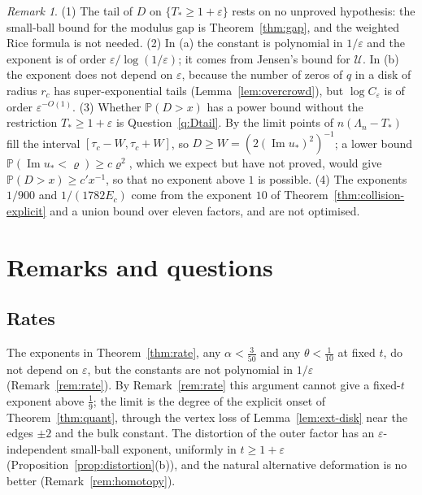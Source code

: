 \documentclass[11pt]{amsart}
\theoremstyle{definition}
\theoremstyle{remark}
\newtheorem{remark}[theorem]{Remark}
\numberwithin{equation}{section}
\newcommand{\PP}{\mathbb{P}}
\newcommand{\eps}{\varepsilon}
\DeclareMathOperator{\im}{Im}
\begin{document}
\begin{remark}\label{rem:Dtail}
(1) The tail of $D$ on $\{T_*\ge1+\eps\}$ rests on no unproved hypothesis: the small-ball bound for the modulus gap is Theorem~\ref{thm:gap}, and the weighted Rice formula is not needed. (2) In (a) the constant is polynomial in $1/\eps$ and the exponent is of order $\eps/\log(1/\eps)$; it comes from Jensen's bound for $\mathcal U$. In (b) the exponent does not depend on $\eps$, because the number of zeros of $q$ in a disk of radius $r_c$ has super-exponential tails (Lemma~\ref{lem:overcrowd}), but $\log C_\eps$ is of order $\eps^{-O(1)}$. (3) Whether $\PP(D>x)$ has a power bound without the restriction $T_*\ge1+\eps$ is Question~\ref{q:Dtail}. By \cite[Theorem~\ref{M-thm:firstorder-intro}]{Main} the limit points of $n(\Lambda_n-T_*)$ fill the interval $[\tau_c-W,\tau_c+W]$, so $D\ge W=(2(\im u_*)^2)^{-1}$; a lower bound $\PP(\im u_*<\varrho)\ge c\varrho^2$, which we expect but have not proved, would give $\PP(D>x)\ge c'x^{-1}$, so that no exponent above $1$ is possible. (4) The exponents $1/900$ and $1/(1782E_c)$ come from the exponent $10$ of Theorem~\ref{thm:collision-explicit} and a union bound over eleven factors, and are not optimised.
\end{remark}

\section{Remarks and questions}\label{sec:remarks}

\subsection{Rates}\label{subsec:rates-questions}
The exponents in Theorem~\ref{thm:rate}, any $\alpha<\frac3{50}$ and any $\theta<\frac1{10}$ at fixed $t$, do not depend on $\eps$, but the constants are not polynomial in $1/\eps$ (Remark~\ref{rem:rate}). By Remark~\ref{rem:rate} this argument cannot give a fixed-$t$ exponent above $\frac19$; the limit is the degree of the explicit onset of Theorem~\ref{thm:quant}, through the vertex loss of Lemma~\ref{lem:ext-disk} near the edges $\pm2$ and the bulk constant. The distortion of the outer factor has an $\eps$-independent small-ball exponent, uniformly in $t\ge1+\eps$ (Proposition~\ref{prop:distortion}(b)), and the natural alternative deformation is no better (Remark~\ref{rem:homotopy}).
\end{document}
